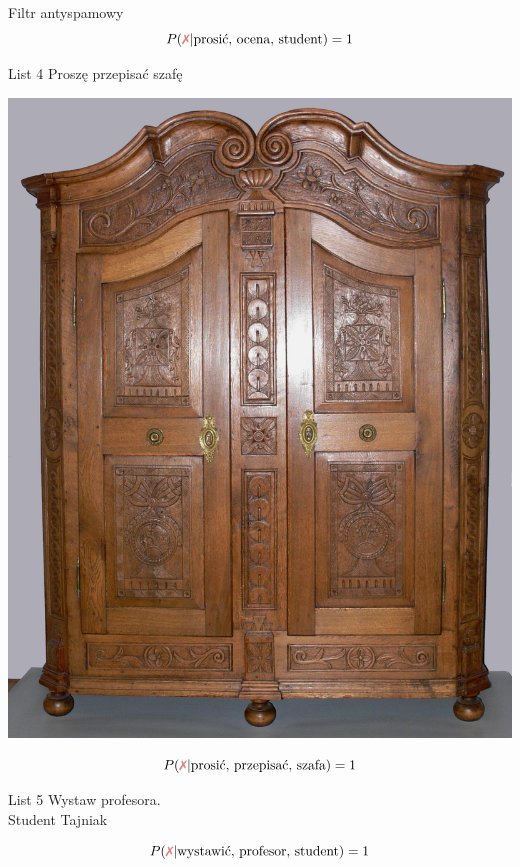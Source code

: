 \documentclass{mp}
\begin{document}
\begin{frame}{Filtr antyspamowy}
{\[ P(\xmark | \text{prosić, ocena, student})=1 \]
}
{
	\begin{minipage}{.50\textwidth}
\begin{block}{List 4}
Proszę przepisać szafę
\end{block}
\end{minipage}
\hfill
\begin{minipage}{.45\textwidth}
\begin{centering}
\includegraphics[height=.4\textheight]{bayes/Eichenschrank_Oberschwaben.jpg}\\
\end{centering}
\end{minipage}
\[ P(\xmark | \text{prosić, przepisać, szafa})=1 \]
}
{
	\begin{minipage}{.50\textwidth}
\begin{block}{List 5}
Wystaw profesora.\\
Student Tajniak
\end{block}
\end{minipage}
\hfill
\begin{minipage}{.45\textwidth}
\begin{centering}
\def\svgwidth{.8\textwidth}

\end{centering}
\end{minipage}
\[ P(\xmark | \text{wystawić, profesor, student})=1 \]
}


\end{frame}
\end{document}
